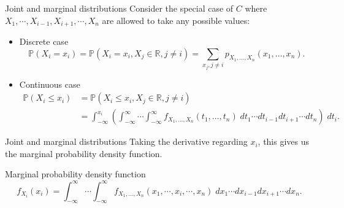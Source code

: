 \documentclass [aspectratio=169]{beamer}
\begin{document}
\begin{frame}{Joint and marginal distributions}
Consider the special case of $C$ where $X_1, \cdots, X_{i-1}, X_{i+1}, \cdots, X_n$ are allowed to take any possible values:
\begin{itemize}
    \item Discrete case
    $$
    \mathbb{P}(X_i = x_i) = \mathbb{P}(X_i = x_i, X_j \in \mathbb{R}, j \neq i) = \sum_{x_j, j \neq i}p_{X_{1},\ldots ,X_{n}}(x_{1},\ldots ,x_{n}).
    $$
    \item Continuous case
    \begin{equation*}
        \begin{aligned}
            \mathbb{P}(X_i \le x_i) &= \mathbb{P}(X_i \le x_i, X_j \in \mathbb{R}, j \neq i) \\
         &= \int_{-\infty}^{x_i}\left(\int_{-\infty}^{\infty}\cdots \int_{-\infty}^{\infty} f_{X_{1},\ldots ,X_{n}}(t_{1},\ldots ,t_{n})\; d t_1\cdots d t_{i-1} d t_{i+1}\cdots d t_n\right)\; d {t_i}  .
        \end{aligned}
    \end{equation*}
\end{itemize}
\end{frame}


\begin{frame}{Joint and marginal distributions}
Taking the derivative regarding $x_i$, this gives us the marginal probability density function.
\begin{block}{Marginal probability density function}
$$
    f_{X_i}(x_i) = \int_{-\infty}^{\infty}\cdots \int_{-\infty}^{\infty} f_{X_{1},\ldots ,X_{n}}(x_{1},\cdots, x_i, \cdots ,x_{n})\; d x_1\cdots d x_{i-1} d x_{i+1}\cdots d x_n.
$$
\end{block}
\vspace{0.1in}
\end{frame}
\end{document}
